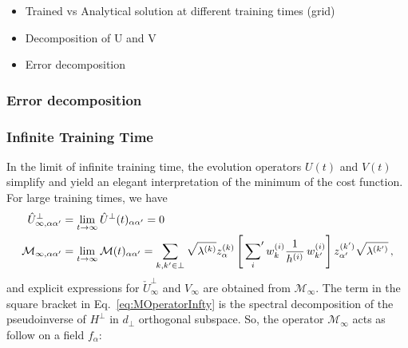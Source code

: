 \begin{itemize}
  \item Trained vs Analytical solution at different training times (grid)
  \item Decomposition of U and V
  \item Error decomposition
\end{itemize}

\subsubsection{Error decomposition}

\subsubsection{Infinite Training Time}
In the limit of infinite training time, the evolution operators $U(t)$ and
$V(t)$ simplify and yield an elegant interpretation of the minimum of the cost
function. For large training times, we have
\begin{align}
    \label{eq:UhatInfty}
    \hat{U}^\perp_{\infty, \alpha\alpha'}
        &= \lim_{t\to\infty}\hat{U}^\perp(t)_{\alpha\alpha'} = 0\, \\
    \label{eq:MOperatorInfty}
    \mathcal{M}_{\infty, \alpha\alpha'} 
        &= \lim_{t\to\infty}\mathcal{M}(t)_{\alpha\alpha'} = \sum_{k,k'\in\perp} \sqrt{\lambda^{(k)}} z^{(k)}_\alpha 
        \left[\sideset{}{'}\sum_{i} w^{(i)}_{k} \frac{1}{h^{(i)}}\, 
        w^{(i)}_{k'}\right] z^{(k')}_{\alpha'} \sqrt{\lambda^{(k')}}\, ,
\end{align}
and explicit expressions for $\check{U}^\perp_{\infty}$ and $V_{\infty}$ are
obtained from $\mathcal{M}_{\infty}$. The term in the square bracket in
Eq.~\eqref{eq:MOperatorInfty} is the spectral decomposition of the pseudoinverse
of $H^\perp$ in $d_\perp$ orthogonal subspace. So, the operator
$\mathcal{M}_{\infty}$ acts as follow on a field $f_{\alpha}$:

